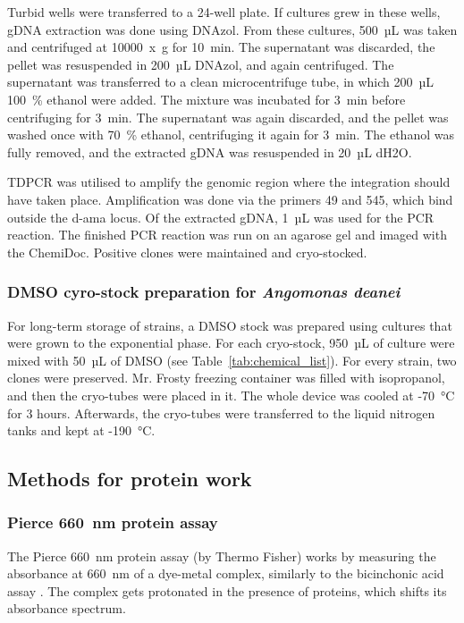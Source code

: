 \par Turbid wells were transferred to a 24-well plate. If cultures grew in these wells, \gls{gDNA} extraction was done using DNAzol. From these cultures, 500~µL was taken and centrifuged at 10000~x~g for 10~min. The supernatant was discarded, the pellet was resuspended in 200~µL DNAzol, and again centrifuged. The supernatant was transferred to a clean microcentrifuge tube, in which 200~µL 100~\% ethanol were added. The mixture was incubated for 3~min before centrifuging for 3~min. The supernatant was again discarded, and the pellet was washed once with 70~\% ethanol, centrifuging it again for 3~min. The ethanol was fully removed, and the extracted gDNA was resuspended in 20~µL \gls{dH2O}.  

\par \gls{TDPCR} was utilised to amplify the genomic region where the integration should have taken place. Amplification was done via the primers 49 and 545, which bind outside the \gls{d-ama} locus. Of the extracted gDNA, 1~µL was used for the PCR reaction. The finished PCR reaction was run on an agarose gel and imaged with the ChemiDoc. Positive clones were maintained and cryo-stocked.
\subsubsection{\Gls{DMSO} cyro-stock preparation for \textit{Angomonas deanei}} \label{txt:Cryo_Adea}
For long-term storage of  strains, a \gls{DMSO} stock was prepared using cultures that were grown to the exponential phase. For each cryo-stock, 950~µL of culture were mixed with 50~µL of DMSO (see Table~\ref{tab:chemical_list}). For every strain, two clones were preserved. Mr. Frosty freezing container was filled with isopropanol, and then the cryo-tubes were placed in it. The whole device was cooled at -70~°C for 3 hours. Afterwards, the cryo-tubes were transferred to the liquid nitrogen tanks and kept at -190~°C.

\subsection{Methods for protein work} 
\subsubsection{Pierce 660~nm protein assay } \label{txt:Pierce_Assay}
The Pierce 660~nm protein assay (by Thermo Fisher) works by measuring the absorbance at 660~nm of a dye-metal complex, similarly to the bicinchonic acid assay \parencite{smith_measurement_1985}. The complex gets protonated in the presence of proteins, which shifts its absorbance spectrum. 
 
